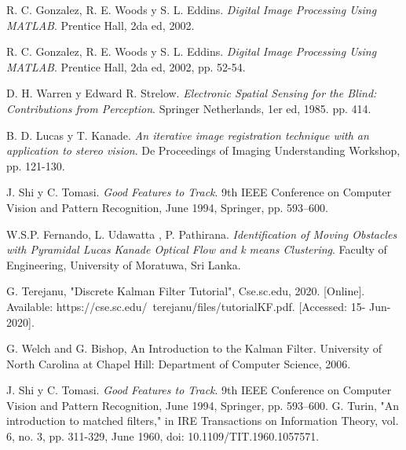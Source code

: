 \begin{thebibliography}{9}

R. C. Gonzalez, R. E. Woods y S. L. Eddins. \textit{Digital Image Processing Using MATLAB}. Prentice Hall, 2da ed, 2002.%

R. C. Gonzalez, R. E. Woods y S. L. Eddins. \textit{Digital Image Processing Using MATLAB}. Prentice Hall, 2da ed, 2002, pp. 52-54.

D. H. Warren y Edward R. Strelow. \textit{Electronic Spatial Sensing for the Blind: Contributions from Perception}. Springer Netherlands, 1er ed, 1985. pp. 414.

B. D. Lucas y T. Kanade. \textit{An iterative image registration technique with an application to stereo vision}. De Proceedings of Imaging Understanding Workshop, pp. 121-130.

J. Shi y C. Tomasi. \textit{Good Features to Track}. 9th IEEE Conference on Computer Vision and Pattern Recognition, June 1994, Springer, pp. 593–600.

W.S.P. Fernando, L. Udawatta , P. Pathirana. \textit{Identification of Moving Obstacles with Pyramidal
Lucas Kanade Optical Flow and k means
Clustering}. Faculty of Engineering, University of Moratuwa, Sri Lanka.

G. Terejanu, "Discrete Kalman Filter Tutorial", Cse.sc.edu, 2020. [Online]. Available: https://cse.sc.edu/~terejanu/files/tutorialKF.pdf. [Accessed: 15- Jun- 2020].

G. Welch and G. Bishop, An Introduction to the Kalman Filter. University of North Carolina at Chapel Hill: Department of Computer Science, 2006.

J. Shi y C. Tomasi. \textit{Good Features to Track}. 9th IEEE Conference on Computer Vision and Pattern Recognition, June 1994, Springer, pp. 593–600.
 G. Turin, "An introduction to matched filters," in IRE Transactions on Information Theory, vol. 6, no. 3, pp. 311-329, June 1960, doi: 10.1109/TIT.1960.1057571.


\end{thebibliography}

